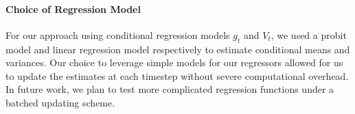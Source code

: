 \documentclass{article}
\begin{document}
\begin{appendices}
\paragraph{Choice of Regression Model} For our approach using conditional regression models $g_t$ and $V_t$, we used a probit model and linear regression model respectively to estimate conditional means and variances. Our choice to leverage simple models for our regressors allowed for us to update the estimates at each timestep without severe computational overhead. In future work, we plan to test more complicated regression functions under a batched updating scheme. 







\end{appendices}
\end{document}
